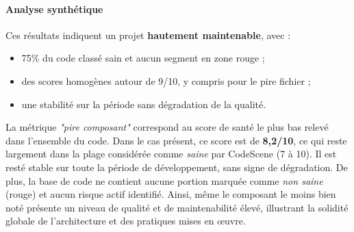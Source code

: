 \paragraph{Analyse synthétique}
Ces résultats indiquent un projet \textbf{hautement maintenable}, avec :
\begin{itemize}
    \item 75\% du code classé sain et aucun segment en zone rouge ;
    \item des scores homogènes autour de 9/10, y compris pour le pire fichier ;
    \item une stabilité sur la période sans dégradation de la qualité.
\end{itemize}

La métrique \textit{"pire composant"} correspond au score de santé le plus bas relevé dans l’ensemble du code.
Dans le cas présent, ce score est de \textbf{8,2/10}, ce qui reste largement dans la plage considérée comme \textit{saine} par CodeScene (7 à 10).
Il est resté stable sur toute la période de développement, sans signe de dégradation.
De plus, la base de code ne contient aucune portion marquée comme \textit{non saine} (rouge) et aucun risque actif identifié.
Ainsi, même le composant le moins bien noté présente un niveau de qualité et de maintenabilité élevé, illustrant la solidité globale de l’architecture et des pratiques mises en œuvre.